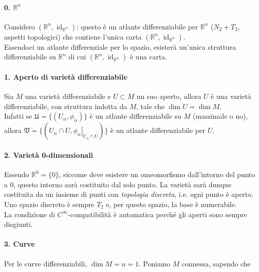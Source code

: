 \paragraph{0. $ \mathbb{R}^{n} $}

Considero $ (\mathbb{R}^{n},\operatorname{id}_{\mathbb{R}^{n}}) $: questo è un atlante differenziabile per $ \mathbb{R}^{n} $ ($ N_{2}+T_{2} $, aspetti topologici) che contiene l'unica carta $ (\mathbb{R}^{n},\operatorname{id}_{\mathbb{R}^{n}}) $.\\
Essendoci un atlante differenziale per lo spazio, esisterà un'unica struttura differenziabile su $ \mathbb{R}^{n} $ di cui $ (\mathbb{R}^{n},\operatorname{id}_{\mathbb{R}^{n}}) $ è una carta.

\paragraph{1. Aperto di varietà differenziabile}

Sia $ M $ una varietà differenziabile e $ U \subset M $ un suo aperto, allora $ U $ è una varietà differenziabile, con struttura indotta da $ M $, tale che $ \dim U = \dim M $.\\
Infatti se $ \mathfrak{U} = \{(U_{\alpha},\phi_{\alpha})\} $ è un atlante differenziabile su $ M $ (massimale o no), allora $ \mathfrak{V} = \{(U_{\alpha} \cap U,\left. \phi_{\alpha} \right|_{U_{\alpha} \cap U})\} $ è un atlante differenziabile per $ U $.

\paragraph{2. Varietà 0-dimensionali}

Essendo $ \mathbb{R}^{0} = \{0\} $, siccome deve esistere un omeomorfismo dall'intorno del punto a $ 0 $, questo intorno sarà costituito dal solo punto. La varietà sarà dunque costituita da un insieme di punti con \textit{topologia discreta}, i.e. ogni punto è aperto. Uno spazio discreto è sempre $ T_{2} $ e, per questo spazio, la base è numerabile.\\
La condizione di $ C^{\infty} $-compatibilità è automatica perché gli aperti sono sempre disgiunti.

\paragraph{3. Curve}

Per le curve differenziabili, $ \dim M = n = 1 $. Poniamo $ M $ connessa, sapendo che

